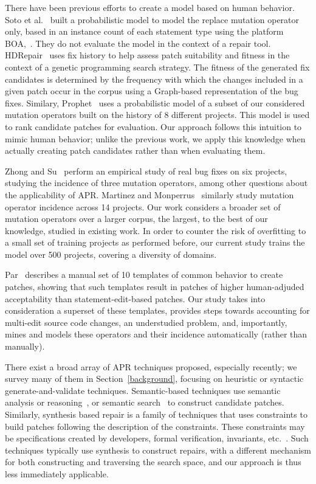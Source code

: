 \documentclass[conference]{IEEEtran}
\begin{document}
There have been previous efforts to create a model based on human behavior.  Soto et al.~\cite{Soto15} 
built a probabilistic model to model the replace mutation 
operator only, based in 
an instance count of each statement type using the platform 
BOA,~\cite{dyer2013}.  They do not evaluate the model in the context of a repair
tool.  
HDRepair~\cite{xuan16} 
uses fix history
to help assess patch suitability and fitness in the context of a genetic
programming search strategy. The fitness of the generated
fix candidates is determined by the frequency with which the changes included in
a given patch occur in the corpus using a Graph-based representation of the bug
fixes.  Similary, Prophet~\cite{long16proph} uses a
probabilistic model of a subset of our considered mutation operators built on 
the history of 8 different projects. This model is used to rank candidate
patches for evaluation.  Our approach follows this intuition to mimic human
behavior; unlike the previous work, we apply this knowledge when actually
creating patch candidates rather than when evaluating them.  

Zhong and Su~\cite{zhong15} perform an empirical study of
real bug fixes on six projects, studying the incidence of three mutation
operators, among other questions about the applicability of APR.  Martinez and
Monperrus~\cite{martinez15} similarly study mutation operator incidence across 14 
projects. Our work considers a broader set of
mutation operators over a larger corpus, the largest, to the best of our
knowledge, studied in existing work. In 
order to counter the 
risk of overfitting to a small set of training projects as performed before, our 
current study trains the model over 500 projects, covering a diversity 
of domains.

Par~\cite{kim2013} describes a manual set of 10 templates of common behavior to
create patches, showing that such templates result in patches of higher
human-adjuded acceptability than statement-edit-based patches.  Our study takes into consideration a superset
of these templates, provides steps towards
accounting for multi-edit source code changes, an understudied problem, and,
importantly, mines and models these operators and their incidence automatically
(rather than manually).

There exist a broad array of APR techniques proposed, especially recently; we
survey many of them in Section~\ref{background}, focusing on heuristic or
syntactic generate-and-validate techniques.  Semantic-based techniques use
semantic analysis or reasoning~\cite{nguyen13,mechtaev15,Mechtaev2016}, or
semantic search~\cite{ke15} to construct candidate patches.  Similarly,
synthesis based repair is a family of techniques that uses constraints to build
patches following the description of the constraints. These constraints may be
specifications created by developers, formal verification, invariants,
etc.~\cite{jin11,wei10}.  Such techniques typically use synthesis to construct
repairs, with a different mechanism for both constructing and traversing the
search space, and our approach is thus less immediately applicable.
 
\end{document}
